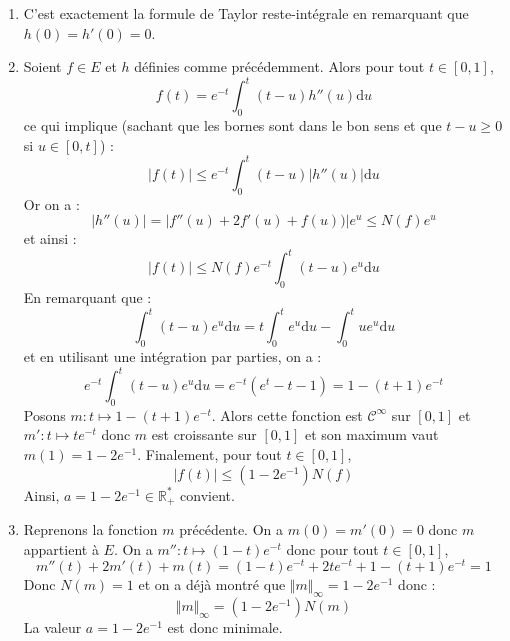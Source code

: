 \documentclass[a4paper,twoside,french,11pt]{VcCours}
\begin{document}
\begin{enumerate}
\item 
C'est exactement la formule de Taylor reste-intégrale en remarquant que $h(0)=h'(0)=0$.
\item Soient $f \in E$ et $h$ définies comme précédemment. Alors pour tout $t \in [0,1]$,
$$ f(t) = e^{-t} \int_{0}^t (t-u) h''(u) \textrm{d}u$$
ce qui implique (sachant que les bornes sont dans le bon sens et que $t-u \geq 0$ si $u \in [0,t]$) :
$$  \vert f(t) \vert \leq e^{-t} \int_{0}^t (t-u) \vert h''(u) \vert  \textrm{d}u$$
Or on a :
$$ \vert h''(u) \vert = \vert f''(u)+2f'(u)+f(u)) \vert e^u \leq N(f) e^u$$
et ainsi :
$$ \vert f(t) \vert \leq  N(f) e^{-t} \int_{0}^t (t-u) e^u\textrm{d}u$$
En remarquant que :
$$ \int_{0}^t (t-u) e^u\textrm{d}u = t \int_{0}^t e^u \textrm{d}u - \int_{0}^t u e^u \textrm{d}u$$
et en utilisant une intégration par parties, on a :
$$  e^{-t} \int_{0}^t (t-u) e^u\textrm{d}u = e^{-t}(e^t-t-1) = 1 -(t+1)e^{-t}$$
Posons $m : t \mapsto 1-(t+1)e^{-t}$. Alors cette fonction est $\mathcal{C}^{\infty}$ sur $[0,1]$ et $m' : t \mapsto t e^{-t}$ donc $m$ est croissante sur $[0,1]$ et son maximum vaut $m(1)= 1-2e^{-1}$. Finalement, pour tout $t \in [0,1]$,
$$ \vert f(t) \vert \leq (1-2e^{-1}) N(f) $$
Ainsi, $a = 1-2e^{-1} \in \mathbb{R}_+^{*}$ convient.
\item Reprenons la fonction $m$ précédente. On a $m(0)=m'(0)=0$ donc $m$ appartient à $E$. On a $m'' : t \mapsto (1-t)e^{-t}$ donc pour tout $t \in [0,1]$,
$$ m''(t)+2m'(t)+m(t) = (1-t)e^{-t} +2t e^{-t} +1 -(t+1)e^{-t} = 1$$
Donc $N(m) =1$ et on a déjà montré que $\Vert m \Vert_{\infty}=1-2 e^{-1}$ donc :
$$ \Vert m \Vert_{\infty}=(1-2 e^{-1}) N(m)$$
La valeur $a = 1-2e^{-1}$ est donc minimale.
\end{enumerate}
\end{document}
